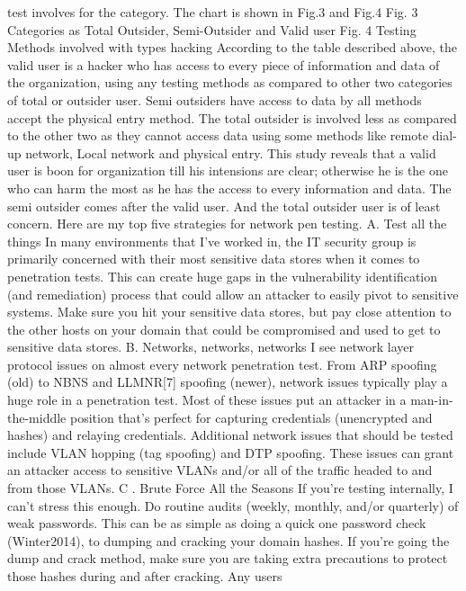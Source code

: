 test involves for the category. The chart is shown in Fig.3 
and Fig.4 
Fig. 3 Categories as Total Outsider, Semi-Outsider and 
Valid user 
Fig. 4  Testing Methods involved with types hacking 
According to the table described above, the valid user is a 
hacker who has access to every piece of information and 
data of the organization, using any testing methods as 
compared to other two categories of total or outsider user. 
Semi outsiders have access to data by all methods accept 
the physical entry method. The total outsider is involved 
less as compared to the other two as they cannot access 
data using some methods like remote dial-up network, 
Local network and physical entry. This study reveals that a 
valid user is boon for organization till his intensions are 
clear; otherwise he is the one who can harm the most as he 
has the access to every information and data. The semi 
outsider comes after the valid user. And the total outsider 
user is of least concern.  
Here are my top five strategies for network pen testing. 
A. Test all the things 
In many environments that I’ve worked in, the IT security 
group is primarily concerned with their most sensitive data 
stores when it comes to penetration tests. This can create 
huge gaps in the vulnerability identification (and 
remediation) process that could allow an attacker to easily 
pivot to sensitive systems. Make sure you hit your sensitive  data stores, but pay close attention to the other hosts on 
your domain that could be compromised and used to get to 
sensitive data stores. 
B. Networks, networks, networks 
I see network layer protocol issues on almost every 
network penetration test. From ARP spoofing (old) to 
NBNS and LLMNR[7] spoofing (newer), network issues 
typically play a huge role in a penetration test. Most of 
these issues put an attacker in a man-in-the-middle position 
that’s perfect for capturing credentials (unencrypted and 
hashes) and relaying credentials. Additional network issues 
that should be tested include VLAN hopping (tag spoofing) 
and DTP spoofing. These issues can grant an attacker 
access to sensitive VLANs and/or all of the traffic headed 
to and from those VLANs. 
C . Brute Force All the Seasons 
If you’re testing internally, I can’t stress this enough. Do 
routine audits (weekly, monthly, and/or quarterly) of weak 
passwords. This can be as simple as doing a quick one 
password check (Winter2014), to dumping and cracking 
your domain hashes. If you’re going the dump and crack 
method, make sure you are taking extra precautions to 
protect those hashes during and after cracking. Any users 

